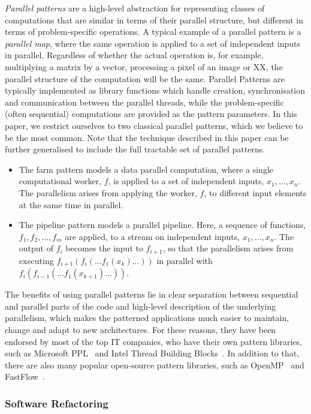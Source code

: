 \noindent
\emph{Parallel patterns} are a high-level abstraction for representing classes of computations that are similar in terms of their parallel structure, but different in terms of problem-specific operations. A typical example of a parallel pattern is a \emph{parallel map}, where the same operation is applied to a set of independent inputs in parallel. Regardless of whether the actual operation is, for example, multiplying a matrix by a vector, processing a pixel of an image or XX, the parallel structure of the computation will be the same. Parallel Patterns are typically implemented as library functions which handle creation, synchronisation and communication between the parallel threads, while the problem-specific (often sequential) computations are provided as the pattern parameters. In this paper, we restrict ourselves to two classical parallel patterns, which we believe to be the most common. Note that the technique described in this paper can be further generalised to include the full tractable set of parallel patterns.
\begin{itemize}
    \item The farm pattern models a data parallel computation, where a single computational worker, $f$, is applied to a set of independent inputs, $x_{1}, ..., x_{n}$. The parallelism arises from applying the worker, $f$, to different input elements at the same time in parallel. 
    \item The pipeline pattern models a parallel pipeline. Here, a sequence of functions, $f_{1}, f_{2}, ..., f_{m}$ are applied, to a stream on independent inputs, $x_{1}, ..., x_{n}$. The output of $f_{i}$ becomes the input to $f_{i+1}$, so that the parallelism arises from executing $f_{i+1}(f_{i}(...f_{1}(x_{k})...))$ in parallel with $f_{i}(f_{i-1}(...f_{1}(x_{k+1})...))$.
\end{itemize}

The benefits of using parallel patterns lie in clear separation between sequential and parallel parts of the code and high-level description of the underlying parallelism, which makes the patterned applications much easier to maintain, change and adapt to new architectures. For these reasons, they have been endorsed by most of the top IT companies, who have their own pattern libraries, such as Microsoft PPL~\cite{ppl} and Intel Thread Building Blocks~\cite{tbb}. In addition to that, there are also many popular open-source pattern libraries, such as OpenMP~\cite{openmp} and FastFlow~\cite{openmp}.

\subsubsection*{Software Refactoring}

